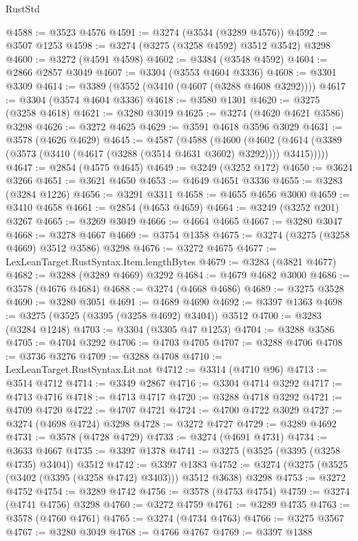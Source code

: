 \begin{lexlean}{RustStd}
\begin{coremodule}
@4588 := @3523 @4576
@4591 := @3274 (@3534 (@3289 @4576))
@4592 := @3507 @1253
@4598 := @3274 (@3275 (@3258 @4592) @3512 @3542) @3298
@4600 := @3272 (@4591 @4598)
@4602 := @3384 (@3548 @4592)
@4604 := @2866 @2857 @3049
@4607 := @3304 (@3553 @4604 @3336)
@4608 := @3301 @3309
@4614 := @3389 (@3552 (@3410 (@4607 (@3288 @4608 @3292))))
@4617 := @3304 (@3574 @4604 @3336)
@4618 := @3580 @1301
@4620 := @3275 (@3258 @4618)
@4621 := @3280 @3019
@4625 := @3274 (@4620 @4621 @3586) @3298
@4626 := @3272 @4625
@4629 := @3591 @4618 @3596 @3029
@4631 := @3578 (@4626 @4629)
@4645 := @4587
    (@4588
      (@4600
        (@4602 (@4614 (@3389 (@3573 (@3410 (@4617 (@3288 (@3514 @4631 @3602) @3292)))) @3415)))))
@4647 := @2854 (@4575 @4645)
@4649 := @3249 (@3252 @172)
@4650 := @3624 @3266
@4651 := @3621 @4650
@4653 := @4649 @4651 @3336
@4655 := @3283 (@3284 @1226)
@4656 := @3291 @3311
@4658 := @4655 @4656 @3000
@4659 := @3410 @4658
@4661 := @2854 (@4653 @4659)
@4664 := @3249 (@3252 @201) @3267
@4665 := @3269 @3049
@4666 := @4664 @4665
@4667 := @3280 @3047
@4668 := @3278 @4667
@4669 := @3754 @1358
@4675 := @3274 (@3275 (@3258 @4669) @3512 @3586) @3298
@4676 := @3272 @4675
@4677 := LexLeanTarget.RustSyntax.Item.lengthBytes
@4679 := @3283 (@3821 @4677)
@4682 := @3288 (@3289 @4669) @3292
@4684 := @4679 @4682 @3000
@4686 := @3578 (@4676 @4684)
@4688 := @3274 (@4668 @4686)
@4689 := @3275 @3528
@4690 := @3280 @3051
@4691 := @4689 @4690
@4692 := @3397 @1363
@4698 := @3275 (@3525 (@3395 (@3258 @4692) @3404)) @3512
@4700 := @3283 (@3284 @1248)
@4703 := @3304 (@3305 @47 @1253)
@4704 := @3288 @3586
@4705 := @4704 @3292
@4706 := @4703 @4705
@4707 := @3288 @4706
@4708 := @3736 @3276
@4709 := @3288 @4708
@4710 := LexLeanTarget.RustSyntax.Lit.nat
@4712 := @3314 (@4710 @96)
@4713 := @3514 @4712
@4714 := @3349 @2867
@4716 := @3304 @4714 @3292
@4717 := @4713 @4716
@4718 := @4713 @4717
@4720 := @3288 @4718 @3292
@4721 := @4709 @4720
@4722 := @4707 @4721
@4724 := @4700 @4722 @3029
@4727 := @3274 (@4698 @4724) @3298
@4728 := @3272 @4727
@4729 := @3289 @4692
@4731 := @3578 (@4728 @4729)
@4733 := @3274 (@4691 @4731)
@4734 := @3633 @4667
@4735 := @3397 @1378
@4741 := @3275 (@3525 (@3395 (@3258 @4735) @3404)) @3512
@4742 := @3397 @1383
@4752 := @3274 (@3275 (@3525 (@3402 (@3395 (@3258 @4742) @3403))) @3512 @3638) @3298
@4753 := @3272 @4752
@4754 := @3289 @4742
@4756 := @3578 (@4753 @4754)
@4759 := @3274 (@4741 @4756) @3298
@4760 := @3272 @4759
@4761 := @3289 @4735
@4763 := @3578 (@4760 @4761)
@4765 := @3274 (@4734 @4763)
@4766 := @3275 @3567
@4767 := @3280 @3049
@4768 := @4766 @4767
@4769 := @3397 @1388

\end{coremodule}
\end{lexlean}
